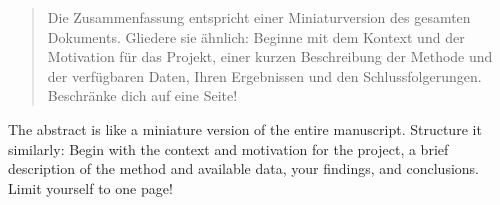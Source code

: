 

\begin{abstract}
Die Zusammenfassung entspricht einer Miniaturversion des gesamten Dokuments. Gliedere sie ähnlich: Beginne mit dem Kontext und der Motivation für das Projekt, einer kurzen Beschreibung der Methode und der verfügbaren Daten, Ihren Ergebnissen und den Schlussfolgerungen. Beschränke dich auf eine Seite! 

\end{abstract}


\renewcommand{\extraabstractname}{Abstract} %
\begin{extraAbstract}

The abstract is like a miniature version of the entire manuscript. Structure it similarly: Begin with the context and motivation for the project, a brief description of the method and available data, your findings, and conclusions. Limit yourself to one page!

\end{extraAbstract}



